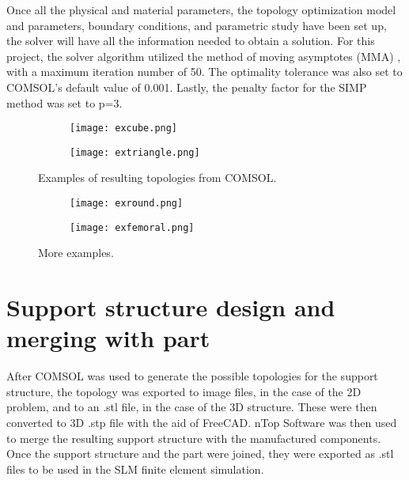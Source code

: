 \documentclass[../main.tex]{subfiles}
\begin{document}
Once all the physical and material parameters, the topology optimization model and parameters, boundary conditions, and parametric study have been set up, the solver will have all the information needed to obtain a solution. For this project, the solver algorithm utilized the method of moving asymptotes (MMA) \cite{svanbergMethodMovingAsymptotes1987}, with a maximum iteration number of 50. The optimality tolerance was also set to COMSOL's default value of 0.001. Lastly, the penalty factor for the SIMP method was set to p=3.

\begin{figure}
  \begin{subfigure}{0.45\textwidth}
    \texttt{[image: excube.png]}
  \end{subfigure}
  \begin{subfigure}{0.45\textwidth}
      \texttt{[image: extriangle.png]}
    \end{subfigure}
    \caption{Examples of resulting topologies from COMSOL.}
  \end{figure}

\begin{figure}
  \begin{subfigure}{0.45\textwidth}
    \texttt{[image: exround.png]}
  \end{subfigure}
  \begin{subfigure}{0.45\textwidth}
      \texttt{[image: exfemoral.png]}
    \end{subfigure}
  \caption{More examples.}
\end{figure}

\section{Support structure design and merging with part}

After COMSOL was used to generate the possible topologies for the support structure, the topology was exported to image files, in the case of the 2D problem, and to an .stl file, in the case of the 3D structure. These were then converted to 3D .stp file with the aid of FreeCAD. nTop Software \cite{NTop} was then used to merge the resulting support structure with the manufactured components. Once the support structure and the part were joined, they were exported as .stl files to be used in the SLM finite element simulation.
\end{document}
